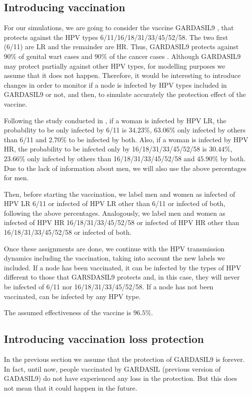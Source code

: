 \subsection{Introducing vaccination} 
For our simulations, we are going to consider the vaccine GARDASIL9 \cite{gardasil9}, that protects against the HPV types 6/11/16/18/31/33/45/52/58. The two first (6/11) are LR and the remainder are HR. Thus, GARDASIL9 protects against $90\%$ of genital wart cases and $90\%$ of the cancer cases \cite{Hartwig2015}. Although GARDASIL9 may protect partially against other HPV types, for modelling purposes we assume that it does not happen. Therefore, it would be interesting to introduce changes in order to monitor if a node is infected by HPV types included in GARDASIL9 or not, and then, to simulate accurately the protection effect of the vaccine.

Following the study conducted in \cite{castellsague2012prevalence}, if a woman is infected by HPV LR, the probability to be only infected by 6/11 is $34.23\%$, $63.06\%$ only infected by others than 6/11 and $2.70\%$ to be infected by both. Also, if a woman is infected by HPV HR, the probability to be infected only by 16/18/31/33/45/52/58 is $30.44\%$, $23.66\%$ only infected by others than 16/18/31/33/45/52/58 and $45.90\%$ by both. Due to the lack of information about men, we will also use the above percentages for men.

Then, before starting the vaccination, we label men and women as infected of HPV LR 6/11 or infected of HPV LR other than 6/11 or infected of both, following the above percentages. Analogously, we label men and women as infected of HPV HR 16/18/31/33/45/52/58 or infected of HPV HR other than 16/18/31/33/45/52/58 or infected of both.

Once these assignments are done, we continue with the HPV transmission dynamics including the vaccination, taking into account the new labels we included. If a node has been vaccinated, it can be infected by the types of HPV different to those that GARSDASIL9 protects and, in this case, they will never be infected of 6/11 nor 16/18/31/33/45/52/58. If a node has not been vaccinated, can be infected by any HPV type. 

The assumed effectiveness of the vaccine is $96.5\%$.

\subsection{Introducing vaccination loss protection}
In the previous section we assume that the protection of GARDASIL9 is forever. In fact, until now, people vaccinated by GARDASIL (previous version of GADASIL9) do not have experienced any loss in the protection. But this does not mean that it could happen in the future. 


